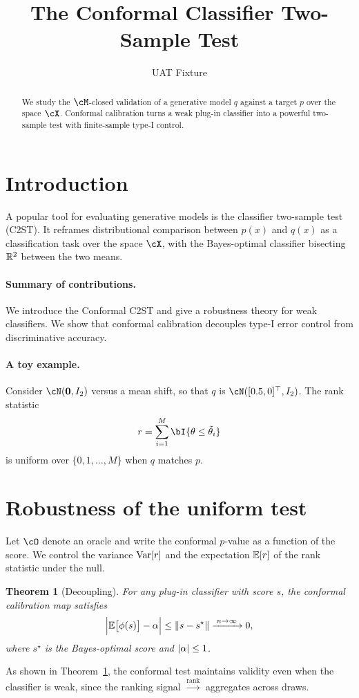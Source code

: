 \documentclass{article}
\title{The Conformal Classifier Two-Sample Test}
\author{UAT Fixture}
\newtheorem{theorem}{Theorem}
\begin{document}
\maketitle

\begin{abstract}
We study the $\cM$-closed validation of a generative model $q$ against a
target $p$ over the space $\cX$. Conformal calibration turns a weak plug-in
classifier into a powerful two-sample test with finite-sample type-I control.
\end{abstract}

\section{Introduction}
A popular tool for evaluating generative models is the classifier two-sample
test (C2ST). It reframes distributional comparison between $p(x)$ and $q(x)$ as
a classification task over the space $\cX$, with the Bayes-optimal classifier
bisecting $\mathbb{R}^2$ between the two means.

\paragraph{Summary of contributions.} We introduce the Conformal C2ST and give
a robustness theory for weak classifiers. We show that conformal calibration
decouples type-I error control from discriminative accuracy.

\paragraph{A toy example.} Consider $\cN(\mathbf{0}, I_2)$ versus a mean shift,
so that $q$ is $\cN([0.5, 0]^\top, I_2)$. The rank statistic
\[
  r = \sum_{i=1}^{M} \bI\{\theta \le \tilde\theta_i\}
\]
is uniform over $\{0, 1, \dots, M\}$ when $q$ matches $p$.

\section{Robustness of the uniform test}
Let $\cO$ denote an oracle and write the conformal $p$-value as a function of
the score. We control the variance $\text{Var}[r]$ and the expectation $\mathbb{E}[r]$ of
the rank statistic under the null.

\begin{theorem}[Decoupling]
\label{thm:decouple}
For any plug-in classifier with score $s$, the conformal calibration map
satisfies
\[
  \Big| \mathbb{E}\big[ \phi(s) \big] - \alpha \Big| \le \left\| {s - s^\star} \right\|
  \xrightarrow{\;n \to \infty\;} 0 ,
\]
where $s^\star$ is the Bayes-optimal score and $\left| {\alpha} \right| \le 1$.
\end{theorem}

As shown in Theorem~\ref{thm:decouple}, the conformal test maintains validity
even when the classifier is weak, since the ranking signal
$\overset{\text{rank}}{\longrightarrow}$ aggregates across draws.
\end{document}
